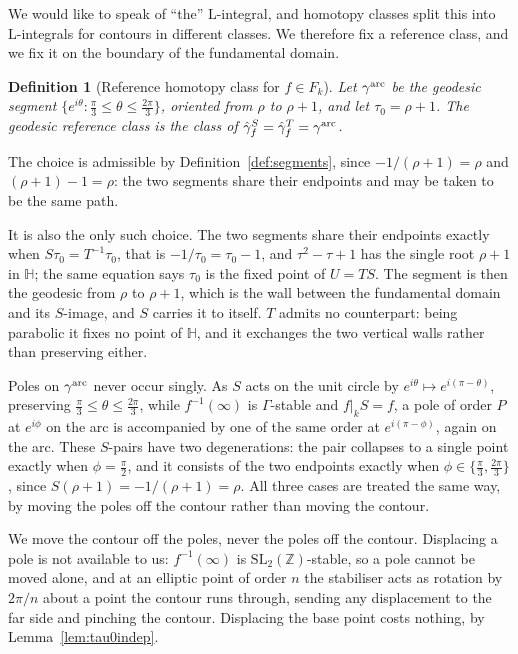\documentclass[11pt]{article}
\newtheorem{definition}[theorem]{Definition}
\newcommand{\HH}{\mathbb{H}}
\newcommand{\ZZ}{\mathbb{Z}}
\newcommand{\SLZ}{\mathrm{SL}_2(\ZZ)}
\begin{document}
We would like to speak of ``the'' L-integral, and homotopy classes split this into L-integrals for
contours in different classes. We therefore fix a reference class, and we fix it on the boundary of
the fundamental domain.

\begin{definition}[Reference homotopy class for $f \in F_k$]\label{def:georef}
Let $\gamma^{\rm arc}$ be the geodesic segment
$\{e^{i\theta}:\tfrac{\pi}{3}\le\theta\le\tfrac{2\pi}{3}\}$, oriented from $\rho$ to $\rho+1$, and
let $\tau_0=\rho+1$. The \emph{geodesic reference class} is the class of
$\hat\gamma^S_f=\hat\gamma^T_f=\gamma^{\rm arc}$.
\end{definition}

The choice is admissible by Definition~\ref{def:segments}, since $-1/(\rho+1)=\rho$ and
$(\rho+1)-1=\rho$: the two segments share their endpoints and may be taken to be the same path.

It is also the only such choice. The two segments share their endpoints exactly when
$S\tau_0=T^{-1}\tau_0$, that is $-1/\tau_0=\tau_0-1$, and $\tau^2-\tau+1$ has the single root
$\rho+1$ in $\HH$; the same equation says $\tau_0$ is the fixed point of $U=TS$. The segment is
then the geodesic from $\rho$ to $\rho+1$, which is the wall between the fundamental domain and
its $S$-image, and $S$ carries it to itself. $T$ admits no counterpart: being parabolic it fixes
no point of $\HH$, and it exchanges the two vertical walls rather than preserving either.

Poles on $\gamma^{\rm arc}$ never occur singly. As $S$ acts on the unit circle by
$e^{i\theta}\mapsto e^{i(\pi-\theta)}$, preserving $\tfrac{\pi}{3}\le\theta\le\tfrac{2\pi}{3}$,
while $f^{-1}(\infty)$ is $\Gamma$-stable and $f|_kS=f$, a pole of order $P$ at $e^{i\phi}$ on the
arc is accompanied by one of the same order at $e^{i(\pi-\phi)}$, again on the arc. These $S$-pairs
have two degenerations: the pair collapses to a single point exactly when $\phi=\tfrac{\pi}{2}$,
and it consists of the two endpoints exactly when $\phi\in\{\tfrac{\pi}{3},\tfrac{2\pi}{3}\}$,
since $S(\rho+1)=-1/(\rho+1)=\rho$. All three cases are treated the same way, by moving the poles
off the contour rather than moving the contour.

We move the contour off the poles, never the poles off the contour. Displacing a pole is not
available to us: $f^{-1}(\infty)$ is $\SLZ$-stable, so a pole cannot be moved alone, and at an
elliptic point of order $n$ the stabiliser acts as rotation by $2\pi/n$ about a point the contour
runs through, sending any displacement to the far side and pinching the contour. Displacing the
base point costs nothing, by Lemma~\ref{lem:tau0indep}.
\end{document}
